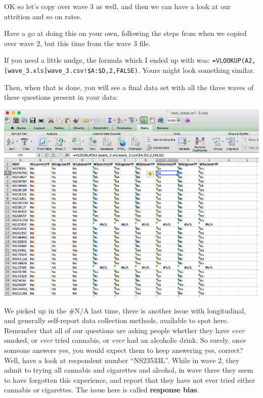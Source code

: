 \documentclass[]{book}
\theoremstyle{definition}
\theoremstyle{definition}
\theoremstyle{definition}
\theoremstyle{remark}
\begin{document}
 OK so let's copy over wave 3 as well, and then we can have a look at
our attrition and so on rates.

Have a go at doing this on your own, following the steps from when we
copied over wave 2, but this time from the wave 3 file.

If you need a little nudge, the formula which I ended up with was:
\texttt{=VLOOKUP(A2,{[}wave\_3.xls{]}wave\_3.csv!\$A:\$D,2,FALSE)}.
Yours might look something similar.

Then, when that is done, you will see a final data set with all the
three waves of these questions present in your data:

\includegraphics{imgs/merged_data_final.png}

We picked up in the \#N/A last time, there is another issue with
longitudinal, and generally self-report data collection methods,
available to spot here. Remember that all of our questions are asking
people whether they have \emph{ever} smoked, or \emph{ever} tried
cannabis, or \emph{ever} had an alcoholic drink. So surely, once someone
answers yes, you would expect them to keep answering yes, correct? Well,
have a look at respondent number ``NS23533L''. While in wave 2, they
admit to trying all cannabis and cigarettes and alcohol, in wave three
they seem to have forgotten this experience, and report that they have
not ever tried either cannabis or cigarettes. The issue here is called
\textbf{response bias}.
\end{document}
